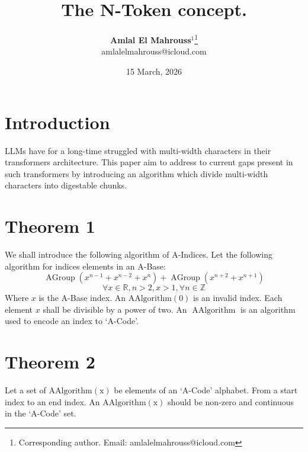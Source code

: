 \documentclass[10pt, twocolumn]{article}
\title{%
  \vspace{-1.5em}%
  \large\textbf{The N-Token concept.}%
}
\author{%
  \textbf{Amlal El Mahrouss}$^{1}$\thanks{Corresponding author. Email: amlalelmahrouss@icloud.com}
  \\amlalelmahrouss@icloud.com\\[0.4em]
}
\date{%
  \small 15 March, 2026
}
\theoremstyle{plain}
\theoremstyle{definition}
\theoremstyle{remark}
\begin{document}

\twocolumn[{%
  \maketitle
  \vspace{-0.5em}
  \rule{\linewidth}{0.4pt}
  \begin{center}
  \begin{minipage}{0.92\linewidth}
    \small
    \textbf{Abstract.}\enspace
    This development paper presents an algorithm which expresses characters, 'A', 'B', 'Z' as single tokens. Each character has an index chosen by two parties, e.g: A=428, B=422.

    \medskip
    \textbf{Keywords:}\enspace
    Computer Science; Software Engineering;
  \end{minipage}
  \end{center}
  \vspace{0.8em}
  \rule{\linewidth}{0.4pt}
  \vspace{1em}
}]

\section{Introduction}
\label{sec:acode-theorem01}
LLMs have for a long-time struggled with multi-width characters in their transformers architecture. This paper aim to address to current gaps present in such transformers by introducing an algorithm which divide multi-width characters into digestable chunks. 

\section{Theorem 1}
\label{sec:acode-theorem01}

We shall introduce the following algorithm of A-Indices.
Let the following algorithm for indices elements in an A-Base:
\begin{equation}
    \operatorname{AGroup}(x^{n-1}+x^{n-2}+x^{n})+\operatorname{AGroup}(x^{n+2}+x^{n+1})
\end{equation}
\begin{equation}
    \forall x \in \mathbb{R}, n > 2, x > 1, \forall n \in \mathbb{Z}
\end{equation}
Where $x$ is the A-Base index. An $\operatorname{AAlgorithm(0)}$ is an invalid index. Each element $x$ shall be divisible by a power of two. An $\operatorname{AAlgorithm}$ is an algorithm used to encode an index to `A-Code'.

\section{Theorem 2}
\label{sec:acode-theorem02}

Let a set of $\operatorname{AAlgorithm(x)}$ be elements of an `A-Code' alphabet. From a start index to an end index. An $\operatorname{AAlgorithm(x)}$ should be non-zero and continuous in the `A-Code' set. 
\end{document}
